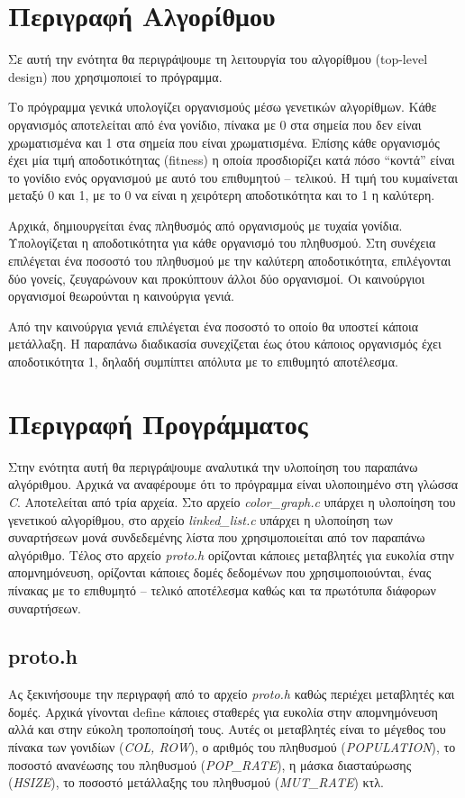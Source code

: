 \documentclass{article}
\begin{document}

\section{Περιγραφή Αλγορίθμου}
Σε αυτή την ενότητα θα περιγράψουμε τη λειτουργία του αλγορίθμου (top-level
design) που χρησιμοποιεί το πρόγραμμα.

Το πρόγραμμα γενικά υπολογίζει οργανισμούς μέσω γενετικών αλγορίθμων. Κάθε
οργανισμός αποτελείται από ένα γονίδιο, πίνακα με 0 στα σημεία που δεν είναι 
χρωματισμένα και 1 στα σημεία που είναι χρωματισμένα. Επίσης κάθε οργανισμός
έχει μία τιμή αποδοτικότητας (fitness) η οποία προσδιορίζει κατά πόσο ``κοντά''
είναι το γονίδιο ενός οργανισμού με αυτό του επιθυμητού -- τελικού. Η τιμή του
κυμαίνεται μεταξύ 0 και 1, με το 0 να είναι η χειρότερη αποδοτικότητα και το 1 η
καλύτερη.

Αρχικά, δημιουργείται ένας πληθυσμός από οργανισμούς με τυχαία γονίδια.
Υπολογίζεται η αποδοτικότητα για κάθε οργανισμό του πληθυσμού. Στη συνέχεια
επιλέγεται ένα ποσοστό του πληθυσμού με την καλύτερη αποδοτικότητα, επιλέγονται
δύο γονείς, ζευγαρώνουν και προκύπτουν άλλοι δύο οργανισμοί. Οι καινούργιοι
οργανισμοί θεωρούνται η καινούργια γενιά.

Από την καινούργια γενιά επιλέγεται ένα ποσοστό το οποίο θα υποστεί κάποια
μετάλλαξη. Η παραπάνω διαδικασία συνεχίζεται έως ότου κάποιος οργανισμός έχει
αποδοτικότητα 1, δηλαδή συμπίπτει απόλυτα με το επιθυμητό αποτέλεσμα.

\section{Περιγραφή Προγράμματος}
Στην ενότητα αυτή θα περιγράψουμε αναλυτικά την υλοποίηση του παραπάνω
αλγόριθμου. Αρχικά να αναφέρουμε ότι το πρόγραμμα είναι υλοποιημένο στη γλώσσα
\emph{C}. Αποτελείται από τρία αρχεία. Στο αρχείο \emph{color\_graph.c} υπάρχει
η υλοποίηση του γενετικού αλγορίθμου, στο αρχείο \emph{linked\_list.c} υπάρχει η
υλοποίηση των συναρτήσεων μονά συνδεδεμένης λίστα που χρησιμοποιείται από τον
παραπάνω αλγόριθμο. Τέλος στο αρχείο \emph{proto.h} ορίζονται κάποιες μεταβλητές
για ευκολία στην απομνημόνευση, ορίζονται κάποιες δομές δεδομένων που
χρησιμοποιούνται, ένας πίνακας με το επιθυμητό -- τελικό αποτέλεσμα καθώς και τα
πρωτότυπα διάφορων συναρτήσεων.

\subsection{proto.h}
Ας ξεκινήσουμε την περιγραφή από το αρχείο \emph{proto.h} καθώς περιέχει
μεταβλητές και δομές. Αρχικά γίνονται define κάποιες σταθερές για ευκολία στην
απομνημόνευση αλλά και στην εύκολη τροποποίησή τους. Αυτές οι μεταβλητές είναι
το μέγεθος του πίνακα των γονιδίων (\emph{COL, ROW}), ο αριθμός του πληθυσμού
(\emph{POPULATION}), το ποσοστό ανανέωσης του πληθυσμού (\emph{POP\_RATE}), η
μάσκα διασταύρωσης (\emph{HSIZE}), το ποσοστό μετάλλαξης του πληθυσμού
(\emph{MUT\_RATE}) κτλ.
\end{document}
